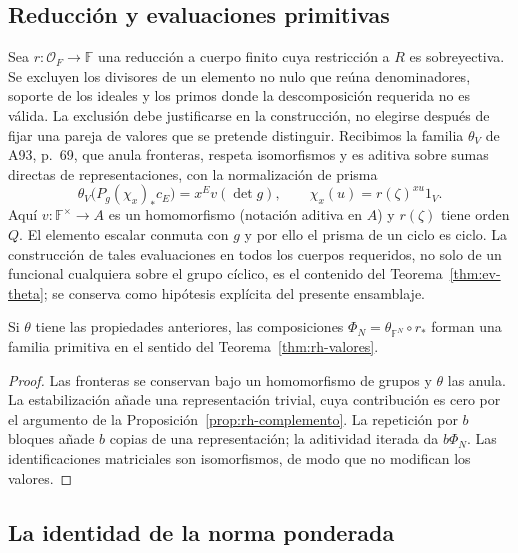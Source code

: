 \subsection{Reducción y evaluaciones primitivas}

Sea $r:\mathcal O_F\to\mathbb F$ una reducción a cuerpo finito cuya restricción a $R$ es sobreyectiva. Se excluyen los divisores de un elemento no nulo que reúna denominadores, soporte de los ideales y los primos donde la descomposición requerida no es válida. La exclusión debe justificarse en la construcción, no elegirse después de fijar una pareja de valores que se pretende distinguir. Recibimos la familia $\theta_V$ de A93, p.~69, que anula fronteras, respeta isomorfismos y es aditiva sobre sumas directas de representaciones, con la normalización de prisma
\begin{equation}
 \theta_V\big(P_g(\chi_x)_*c_E\big)
 =x^E v(\det g),
 \qquad \chi_x(u)=r(\zeta)^{xu}1_V.
 \label{eq:rh-normalizacion}
\end{equation}
Aquí $v:\mathbb F^\times\to A$ es un homomorfismo (notación aditiva en $A$) y $r(\zeta)$ tiene orden $Q$. El elemento escalar conmuta con $g$ y por ello el prisma de un ciclo es ciclo. La construcción de tales evaluaciones en todos los cuerpos requeridos, no solo de un funcional cualquiera sobre el grupo cíclico, es el contenido del Teorema~\ref{thm:ev-theta}; se conserva como hipótesis explícita del presente ensamblaje.

\begin{lema}
\label{lem:rh-primitiva}
Si $\theta$ tiene las propiedades anteriores, las composiciones $\Phi_N=\theta_{\mathbb F^N}\circ r_*$ forman una familia primitiva en el sentido del Teorema~\ref{thm:rh-valores}.
\end{lema}
\begin{proof}
Las fronteras se conservan bajo un homomorfismo de grupos y $\theta$ las anula. La estabilización añade una representación trivial, cuya contribución es cero por el argumento de la Proposición~\ref{prop:rh-complemento}. La repetición por $b$ bloques añade $b$ copias de una representación; la aditividad iterada da $b\Phi_N$. Las identificaciones matriciales son isomorfismos, de modo que no modifican los valores.
\end{proof}

\subsection{La identidad de la norma ponderada}

